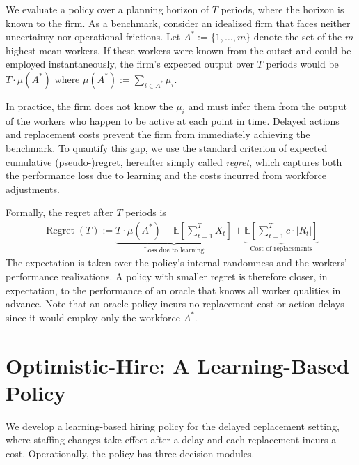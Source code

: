 \documentclass[opre,blindrev]{informs3}
\newcommand{\Regret}{\operatorname{Regret}}
\begin{document}
We evaluate a policy over a planning horizon of \(T\) periods, where the horizon is known to the firm. As a benchmark, consider an idealized firm that faces neither uncertainty nor operational frictions. Let \(A^* := \{1,\dots,m\}\)
denote the set of the \(m\) highest-mean workers. If these workers were known from the outset and could be employed instantaneously, the firm's expected output over \(T\) periods would be \(T \cdot \mu(A^*)\) where \(\mu(A^*) := \sum_{i \in A^*} \mu_i\).

In practice, the firm does not know the \(\mu_i\) and must infer them from the output of the workers who happen to be active at each point in time. Delayed actions and replacement costs prevent the firm from immediately achieving the benchmark. To quantify this gap, we use the standard criterion of expected cumulative (pseudo-)regret, hereafter simply called \emph{regret}, which captures both the performance loss due to learning and the costs incurred from workforce adjustments.

Formally, the regret after \(T\) periods is
\begin{eqnarray}\label{def:regret}
    \Regret(T):=
    \underbrace{T \cdot \mu(A^*) - \mathbb{E}\!\left[\sum_{t=1}^T X_t\right]}_{\text{Loss due to learning}}
    + \underbrace{\mathbb{E}\!\left[\sum_{t=1}^T c \cdot |R_t|\right]}_{\text{Cost of replacements}}
\end{eqnarray}
The expectation is taken over the policy's internal randomness and the workers’ performance realizations. A policy with smaller regret is therefore closer, in expectation, to the performance of an oracle that knows all worker qualities in advance. Note that an oracle policy incurs no replacement cost or action delays since it would employ only the workforce \(A^*\).


\section{Optimistic-Hire: A Learning-Based Policy}\label{sec:alg-desc}
We develop a learning-based hiring policy for the delayed replacement setting, where staffing changes take effect after a delay and each replacement incurs a cost. Operationally, the policy has three decision modules.
\end{document}
